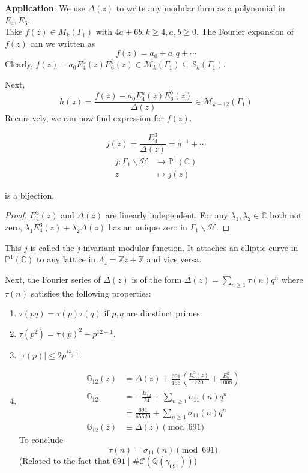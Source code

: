 \documentclass[oneside, 12pt]{scrbook}
\newcommand{\CC}{\mathbb C}
\newcommand{\QQ}{\mathbb Q}
\newcommand{\ZZ}{\mathbb Z}
\newcommand{\PP}{\mathbb{P}}
\newcommand{\bs}{\backslash}
\newcommand{\Hh}{\mathcal{H}}
\newcommand{\Mm}{\mathcal{M}}
\newcommand{\Ss}{\mathcal{S}}
\theoremstyle{theorem}
\begin{document}
\textbf{Application}: We use $\Delta(z)$ to write any modular form as a polynomial in $E_{4},E_{6}$. \\

Take $f(z) \in M_{k} (\Gamma_{1})$ with $4a+6b , k \geq 4, a,b\geq 0$. The Fourier expansion of $f(z)$ can we written as $$f(z) = a_{0} + a_{1}q + \cdots $$
Clearly, $f(z) - a_{0}E_{4}^a(z)E_{6}^b(z) \in \Mm_{k}(\Gamma_{1}) \subseteq \Ss_{k}(\Gamma_{1})$.

Next, $$h(z) = \frac{f(z)-a_{0}E_{4}^a(z)E_{6}^b(z)}{\Delta(z)} \in \Mm_{k-12}(\Gamma_{1})$$ Recursively, we can now find expression for $f(z)$. 

\begin{proposition}
$$j(z) = \frac{E_{4}^3}{\Delta(z)} = q^{-1} + \cdots $$
\begin{align*}
j: \Gamma_{1}\bs \bar{\Hh} &\rightarrow \PP^1(\CC) \\
z &\mapsto j(z)
\end{align*}

is a bijection.
\end{proposition}

\begin{proof}
$E_{4}^3(z)$ and $\Delta(z)$ are linearly independent. For any $\lambda_{1},\lambda_{2} \in \CC$ both not zero, $\lambda_{1}E_{4}^3(z) + \lambda_{2}\Delta(z)$ has an unique zero in $\Gamma_{1}\bs \bar{\Hh}$. 
\end{proof}

\begin{remark}
This $j$ is called the $j$-invariant modular function. It attaches an elliptic curve in $\PP^1 (\CC)$ to any lattice in $\Lambda_{z} = \ZZ z + \ZZ$ and vice versa.
\end{remark}

Next, the Fourier series of $\Delta(z)$ is of the form $\Delta(z) = \sum_{n \geq 1} \tau(n)q^n$ where $\tau(n)$ satisfies the following properties: 
\begin{enumerate}
\item $\tau(pq) =\tau(p)\tau(q)$ if $p,q$ are dinstinct primes. 
\item $\tau(p^2) = \tau(p)^2 - p^{12-1}$.
\item $|\tau(p)| \le 2 p^{\frac{12-1}{2}}$.
\item 
\begin{align*}
\mathbb{G}_{12}(z) &= \Delta(z) + \frac{691}{156} \left( \frac{E_{4}^3(z)}{720} + \frac{E_{6}^2}{1008} \right) \\
\mathbb{G}_{12} &= -\frac{B_{12}}{24} + \sum_{n \geq 1} \sigma_{11}(n) q^n \\
&= \frac{691}{65520} + \sum_{n \geq 1} \sigma_{11}(n) q^n \\ 
\mathbb{G}_{12}(z) &\equiv \Delta(z) \pmod{691}
\end{align*}
To conclude $$\tau(n) = \sigma_{11}(n) \pmod{691}$$
(Related to the fact that $691 \mid \# \mathcal{C}(\QQ(\gamma_{691}))$)
\end{enumerate}
\end{document}
